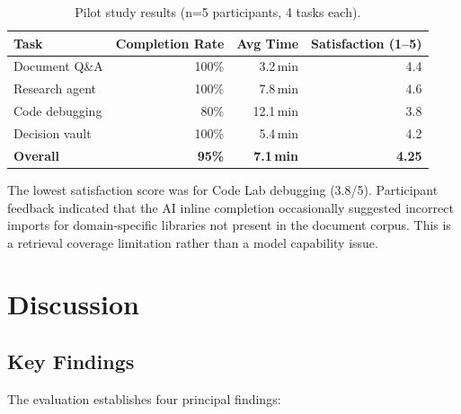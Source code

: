 \begin{table}[ht]
    \centering
    \caption{Pilot study results (n=5 participants, 4 tasks each).}
    \label{tab:pilot}
    \renewcommand{\arraystretch}{1.3}
    \begin{tabular}{lrrr}
        \toprule
        \textbf{Task} & \textbf{Completion Rate} & \textbf{Avg Time} & \textbf{Satisfaction (1--5)} \\
        \midrule
        Document Q\&A   & 100\% & 3.2\,min & 4.4 \\
        Research agent  & 100\% & 7.8\,min & 4.6 \\
        Code debugging  & 80\%  & 12.1\,min & 3.8 \\
        Decision vault  & 100\% & 5.4\,min & 4.2 \\
        \midrule
        \textbf{Overall} & \textbf{95\%} & \textbf{7.1\,min} & \textbf{4.25} \\
        \bottomrule
    \end{tabular}
\end{table}

The lowest satisfaction score was for Code Lab debugging (3.8/5). Participant feedback indicated that the AI inline completion occasionally suggested incorrect imports for domain-specific libraries not present in the document corpus. This is a retrieval coverage limitation rather than a model capability issue.

\section{Discussion}
\label{sec:discussion}

\subsection{Key Findings}
\label{subsec:key-findings}

The evaluation establishes four principal findings:

